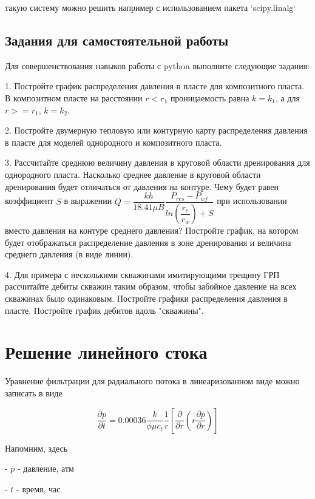 \documentclass[oneside, openany]{memoir}
\begin{document}
	такую систему можно решить например с использованием пакета `scipy.linalg` 
	
	\subsection{Задания для самостоятельной работы}
	
	Для совершенствования навыков работы с python выполните следующие задания:
	
	1. Постройте график распределения давления в пласте для композитного пласта. В композитном пласте на расстоянии $r<r_1$ проницаемость равна $k=k_1$, а для $r>=r_1$, $k=k_2$. 
	
	2. Постройте двумерную тепловую или контурную карту распределения давления в пласте для моделей однородного и композитного пласта.
	
	3. Рассчитайте среднюю величину давления в круговой области дренирования для однородного пласта. Насколько среднее давление в круговой области дренирования будет отличаться от давления на контуре. Чему будет равен коэффициент $S$ в выражении  $Q=\dfrac{kh}{18.41\mu B} \dfrac{P_{res}-P_{wf}}{ln(\dfrac{r_e}{r_w})+S}$ при использовании вместо давления на контуре среднего давления? Постройте график, на котором будет отображаться распределение давления в зоне дренирования и величина среднего давления (в виде линии).
	
	4. Для примера с несколькими скважинами имитирующими трещину ГРП рассчитайте дебиты скважин таким образом, чтобы забойное давление на всех скважинах было одинаковым. Постройте графики распределения давления в пласте. Постройте график дебитов вдоль "скважины".
	
	\section{Решение линейного стока}
	
	Уравнение фильтрации для радиального потока в линеаризованном виде можно записать в виде
	
	\begin{equation}
		\frac{\partial p}{\partial t} = 0.00036 \dfrac{k}{\phi \mu c_t} \dfrac{1}{r} \left[ \dfrac{\partial}{\partial r} \left( r \dfrac{ \partial p} {\partial r} \right) \right]		
	\end{equation} 

	
	Напомним, здесь
	
	- $p$ - давление, атм
	
	- $t$ - время, час
	
\end{document}
